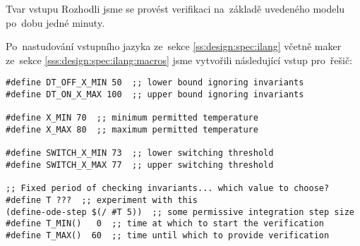 \documentclass[thesis=M,czech]{FITthesis}[2012/06/26]
\newcommand{\rf}[1]{\ref{#1}}
\begin{document}

\begin{section}{Tvar vstupu}\label{s:example:input}
Rozhodli jsme se provést verifikaci
na~základě uvedeného modelu
po~dobu jedné minuty.

Po~nastudování vstupního jazyka
ze~sekce \rf{ss:design:spec:ilang}
včetně maker ze~sekce \rf{sss:design:spec:ilang:macros}
jsme vytvořili následující vstup pro~řešič:
\begin{Verbatim}[samepage=true]
#define DT_OFF_X_MIN 50  ;; lower bound ignoring invariants
#define DT_ON_X_MAX 100  ;; upper bound ignoring invariants

#define X_MIN 70  ;; minimum permitted temperature
#define X_MAX 80  ;; maximum permitted temperature

#define SWITCH_X_MIN 73  ;; lower switching threshold
#define SWITCH_X_MAX 77  ;; upper switching threshold

;; Fixed period of checking invariants... which value to choose?
#define T ???  ;; experiment with this
(define-ode-step $(/ #T 5))  ;; some permissive integration step size
#define T_MIN()   0  ;; time at which to start the verification
#define T_MAX()  60  ;; time until which to provide verification


\end{Verbatim}
\end{section}
\end{document}
